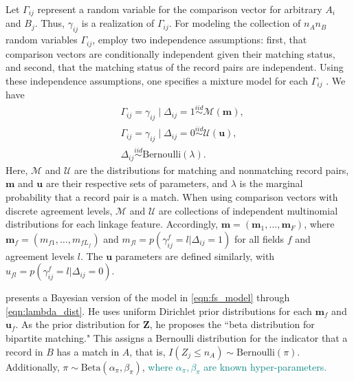 \documentclass[ba]{imsart}
\begin{document}
Let $\Gamma_{ij}$ represent a random variable for the comparison vector for arbitrary $A_i$ and $B_j$.  Thus, $\gamma_{ij}$ is a realization of $\Gamma_{ij}$.  For modeling the collection of $n_An_B$ random variables $\Gamma_{ij}$, \cite{fellegi_theory_1969} employ two independence assumptions: first, that comparison vectors are conditionally independent given their matching status, and second, that the matching status of the record pairs are independent. Using these independence assumptions,  one specifies a mixture model for each $\Gamma_{ij}$ \citep[e.g., as in ][]{winkler_state_1999,jaro1989,larsen_2001,enamorado2019using}.  We have
\begin{subequations}
\begin{align}
&\Gamma_{ij} = \gamma_{ij} \mid \Delta_{ij} = 1 \stackrel{iid}{\sim} \mathcal{M}(\bm{m}), \label{eqn:fs_model} \\
&\Gamma_{ij} = \gamma_{ij} \mid \Delta_{ij} = 0  \stackrel{iid}{\sim} \mathcal{U}(\bm{u}), \label{eqn:m_dist}\\
&\Delta_{ij}   \stackrel{iid}{\sim} \text{Bernoulli}(\lambda). \label{eqn:lambda_dist}
\end{align}
\end{subequations}
Here, $\mathcal{M}$ and $\mathcal{U}$ are the distributions for matching and nonmatching record pairs, $\bm{m}$ and $\bm{u}$ are their respective sets of parameters, and $\lambda$ is the marginal probability that a record pair is a match. When using comparison vectors with discrete agreement levels, $\mathcal{M}$ and $\mathcal{U}$ are collections of independent multinomial distributions for each linkage feature. Accordingly, $\bm{m} = (\bm{m}_1, \ldots, \bm{m}_F)$, where $\bm{m}_f = (m_{f1}, \ldots, m_{fL_f})$ and $m_{fl} = p(\gamma_{ij}^f = l|\Delta_{ij} = 1)$ for all fields $f$ and agreement levels $l$. The $\bm{u}$ parameters are defined similarly, with $u_{fl} = p(\gamma_{ij}^f = l|\Delta_{ij} = 0)$.

\cite{sadinle_bayesian_2017} presents a Bayesian version of the model in \eqref{eqn:fs_model} through \eqref{eqn:lambda_dist}.  He uses uniform Dirichlet prior distributions for each $\bm{m}_f$ and $\bm{u}_f$.  As the prior distribution for  $\bm{Z}$, he proposes the ``beta distribution for bipartite matching."  This assigns a Bernoulli distribution for the indicator that a record in $B$ has a match in $A$, that is, $I(Z_j \leq n_A) \sim \text{Bernoulli}(\pi)$.  Additionally, $\pi \sim \text{Beta}(\alpha_{\pi}, \beta_{\pi})$, \textcolor{teal}{where  $\alpha_{\pi}, \beta_{\pi}$ are known hyper-parameters.}
\end{document}
